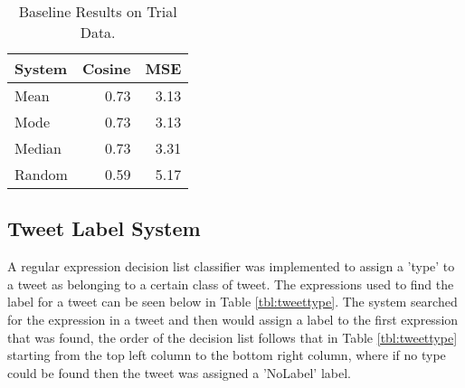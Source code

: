 \documentclass[11pt,letterpaper]{article}
\begin{document}
\begin{table}[ht!]
\begin{center}
\begin{tabular}{|l|r|r|}
\hline
System & Cosine & MSE\\
\hline
Mean & 0.73 & 3.13\\
Mode & 0.73 & 3.13\\
Median & 0.73 & 3.31\\
Random & 0.59  & 5.17\\
\hline
\end{tabular}
\end{center}
\caption{Baseline Results on Trial Data.}
\label{tbl:baselines}
\end{table}

\subsection{Tweet Label System}
A regular expression decision list classifier was implemented to assign a 'type' to a tweet as belonging to a certain class of tweet. The expressions used to find the label for a tweet can be seen below in Table \ref{tbl:tweettype}. The system searched for the expression in a tweet and then would assign a label to the first expression that was found, the order of the decision list follows that in Table \ref{tbl:tweettype} starting from the top left column to the bottom right column, where if no type could be found then the tweet was assigned a 'NoLabel' label.

\begin{table}[ht!]
\caption{Tweet Label Type and Expression.}
\label{tbl:tweettype}
\end{table}
\end{document}
